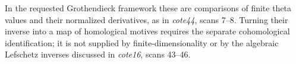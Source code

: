 In the requested Grothendieck framework these are comparisons of
finite theta values and their normalized derivatives, as in
\emph{cote44}, scans 7--8.  Turning their inverse into a map of
homological motives requires the separate cohomological
identification; it is not supplied by finite-dimensionality or by
the algebraic Lefschetz inverses discussed in \emph{cote16},
scans 43--46.
